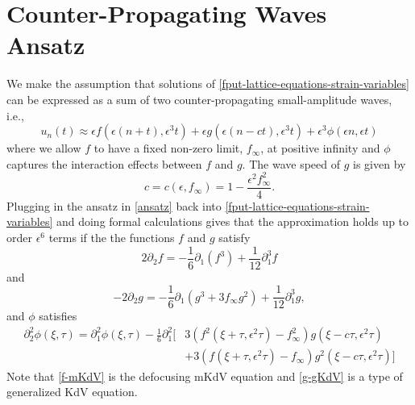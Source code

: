 \section{Counter-Propagating Waves Ansatz}

We make the assumption that solutions of \cref{fput-lattice-equations-strain-variables} can be expressed as a sum of two counter-propagating small-amplitude waves, i.e., 
\begin{equation}\label{ansatz}
	u_n(t) \approx \epsilon f(\epsilon(n+t), \epsilon^3t) + \epsilon g(\epsilon(n-ct), \epsilon^3 t) + \epsilon^3\phi(\epsilon n, \epsilon t)
\end{equation}
where we allow \(f\) to have a fixed non-zero limit, \(f_\infty\), at positive infinity and \(\phi\) captures the interaction effects between \(f\) and \(g\). The wave speed of \(g\) is given by
\begin{equation}
	c = c(\epsilon, f_\infty) = 1 - \frac{\epsilon^2 f_\infty^2}{4}.
\end{equation}
Plugging in the ansatz in \cref{ansatz} back into \cref{fput-lattice-equations-strain-variables} and doing formal calculations gives that the approximation holds up to order \(\epsilon^6\) terms if the the functions \(f\) and \(g\) satisfy
\begin{equation}\label{f-mKdV}
	2 \partial_2 f = - \frac 1 6 \partial_1(f^3) + \frac 1 {12} \partial_1^3 f
\end{equation}
and 
\begin{equation}\label{g-gKdV}
	-2 \partial_2 g = - \frac 1 6 \partial_1 (g^3 + 3f_\infty g^2) + \frac 1 {12}\partial_1^3 g,
\end{equation}
and \(\phi\) satisfies
\begin{equation}\label{phi-pde}
	\begin{aligned}
		\partial_2^2 \phi(\xi, \tau) = \partial_1^2\phi(\xi, \tau)- \frac 1 6 \partial_1^2 \big[& 3(f^2(\xi+\tau,\epsilon^2\tau)-f_\infty^2)g(\xi-c\tau,\epsilon^2\tau) \\&+ 3 (f(\xi+\tau,\epsilon^2\tau)-f_\infty)g^2(\xi-c\tau,\epsilon^2\tau) \big ]
	\end{aligned}
\end{equation}
Note that \cref{f-mKdV} is the defocusing mKdV equation and \cref{g-gKdV} is a type of generalized KdV equation.

